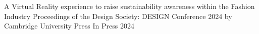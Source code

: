 

\begin{cvhonors}

  \cvhonor
    {A Virtual Reality experience to raise sustainability awareness within the Fashion Industry} %
    {\linebreak Proceedings of the Design Society: DESIGN Conference 2024 by Cambridge University Press} %
    {In Press} %
    {2024} %

\end{cvhonors}

